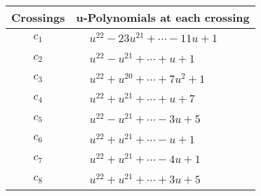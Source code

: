 \documentclass[1p]{elsarticle_modified}
\theoremstyle{definition}
\begin{document}
\begin{tabular}{m{50pt}|m{274pt}}
Crossings & \hspace{64pt}u-Polynomials at each crossing \\
\hline $$\begin{aligned}c_{1}\end{aligned}$$&$\begin{aligned}
&u^{22}-23 u^{21}+\cdots-11 u+1
\end{aligned}$\\
\hline $$\begin{aligned}c_{2}\end{aligned}$$&$\begin{aligned}
&u^{22}- u^{21}+\cdots+u+1
\end{aligned}$\\
\hline $$\begin{aligned}c_{3}\end{aligned}$$&$\begin{aligned}
&u^{22}+u^{20}+\cdots+7 u^2+1
\end{aligned}$\\
\hline $$\begin{aligned}c_{4}\end{aligned}$$&$\begin{aligned}
&u^{22}+u^{21}+\cdots+u+7
\end{aligned}$\\
\hline $$\begin{aligned}c_{5}\end{aligned}$$&$\begin{aligned}
&u^{22}- u^{21}+\cdots-3 u+5
\end{aligned}$\\
\hline $$\begin{aligned}c_{6}\end{aligned}$$&$\begin{aligned}
&u^{22}+u^{21}+\cdots- u+1
\end{aligned}$\\
\hline $$\begin{aligned}c_{7}\end{aligned}$$&$\begin{aligned}
&u^{22}+u^{21}+\cdots-4 u+1
\end{aligned}$\\
\hline $$\begin{aligned}c_{8}\end{aligned}$$&$\begin{aligned}
&u^{22}+u^{21}+\cdots+3 u+5
\end{aligned}$\\

\end{tabular}
\end{document}
